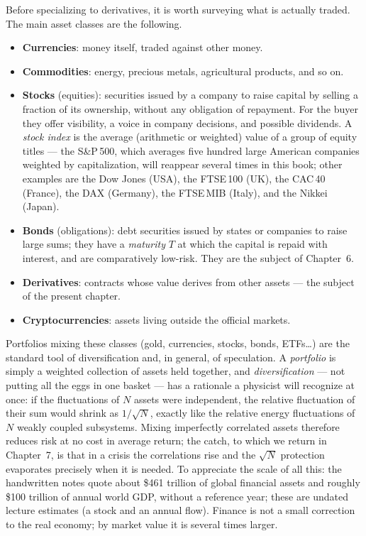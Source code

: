 Before specializing to derivatives, it is worth surveying what is actually traded.
The main asset classes are the following.
\begin{itemize}
    \item \textbf{Currencies}: money itself, traded against other money.
    \item \textbf{Commodities}: energy, precious metals, agricultural products, and so on.
    \item \textbf{Stocks} (equities): securities issued by a company to raise capital by selling a fraction of its ownership, without any obligation of repayment.
    For the buyer they offer visibility, a voice in company decisions, and possible dividends.
    A \emph{stock index} is the average (arithmetic or weighted) value of a group of equity titles --- the S\&P\,500, which averages five hundred large American companies weighted by capitalization, will reappear several times in this book; other examples are the Dow Jones (USA), the FTSE\,100 (UK), the CAC\,40 (France), the DAX (Germany), the FTSE\,MIB (Italy), and the Nikkei (Japan).
    \item \textbf{Bonds} (obligations): debt securities issued by states or companies to raise large sums; they have a \emph{maturity} $T$ at which the capital is repaid with interest, and are comparatively low-risk.
    They are the subject of Chapter~6.
    \item \textbf{Derivatives}: contracts whose value derives from other assets --- the subject of the present chapter.
    \item \textbf{Cryptocurrencies}: assets living outside the official markets.
\end{itemize}
Portfolios mixing these classes (gold, currencies, stocks, bonds, ETFs\ldots) are the standard tool of diversification and, in general, of speculation.
A \emph{portfolio} is simply a weighted collection of assets held together, and \emph{diversification} --- not putting all the eggs in one basket --- has a rationale a physicist will recognize at once: if the fluctuations of $N$ assets were independent, the relative fluctuation of their sum would shrink as $1/\sqrt{N}$, exactly like the relative energy fluctuations of $N$ weakly coupled subsystems.
Mixing imperfectly correlated assets therefore reduces risk at no cost in average return; the catch, to which we return in Chapter~7, is that in a crisis the correlations rise and the $\sqrt{N}$ protection evaporates precisely when it is needed.
To appreciate the scale of all this: the handwritten notes quote about \$461 trillion of global financial assets and roughly \$100 trillion of annual world GDP, without a reference year; these are undated lecture estimates (a stock and an annual flow).
Finance is not a small correction to the real economy; by market value it is several times larger.



